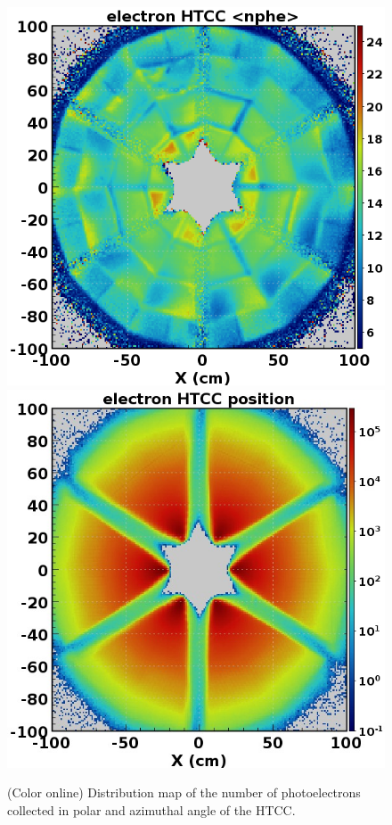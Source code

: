 \documentclass[final,3p,twocolumn]{elsarticle}
\begin{document}
\begin{figure}[th!]
\centerline{\includegraphics[width=0.95\columnwidth]{e_HTCCnphe.png}
\hspace{1cm}\includegraphics[width=0.95\columnwidth]{htcc-accept.jpg}}
\caption{(Color online) Distribution map of the number of photoelectrons collected in polar and azimuthal angle of the HTCC. 
}
\end{figure}
\end{document}

